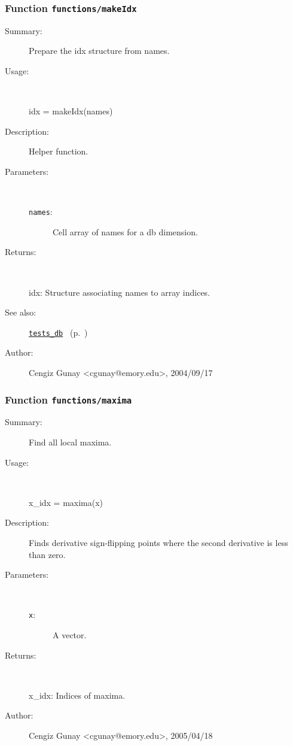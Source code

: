 \subsubsection[Function \texttt{makeIdx}]{Function \texttt{functions/makeIdx}}%
%
\label{ref_functions__makeIdx}%
\hypertarget{ref_functions__makeIdx}{}%
\begin{description}
\item[Summary:]Prepare the idx structure from names.
%
\item[Usage:]~%
\begin{lyxcode}%
idx = makeIdx(names)
%
\end{lyxcode}%
%
\item[Description:]%
Helper function.
\item[Parameters:]~
\begin{description}%
\item[\texttt{names}:]
 Cell array of names for a db dimension.
\end{description}%
%
\item[Returns:
]~

	idx: Structure associating names to array indices.
%
%
\item[See also:]%
\hyperlink{ref_tests_db}{\texttt{tests\_db}}%
\ (p.~\pageref{ref_tests_db})%
%
%
\item[Author:]%
Cengiz Gunay <cgunay@emory.edu>, 2004/09/17
%
\end{description}
\methodline%
\subsubsection[Function \texttt{maxima}]{Function \texttt{functions/maxima}}%
%
\label{ref_functions__maxima}%
\hypertarget{ref_functions__maxima}{}%
\begin{description}
\item[Summary:]Find all local maxima.
%
\item[Usage:]~%
\begin{lyxcode}%
x\_idx = maxima(x)
%
\end{lyxcode}%
%
\item[Description:]%
Finds derivative sign-flipping points where the second derivative is 
 less than zero.
\item[Parameters:]~
\begin{description}%
\item[\texttt{x}:]
 A vector.
\end{description}%
%
\item[Returns:
]~

 	x\_idx: Indices of maxima.
%
%
%
\item[Author:]%
Cengiz Gunay <cgunay@emory.edu>, 2005/04/18
%
\end{description}
\methodline%
